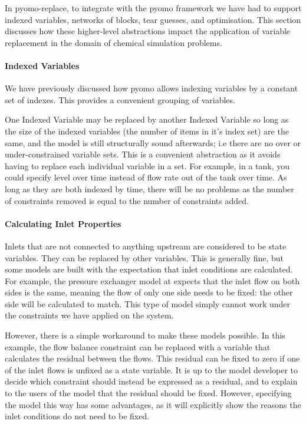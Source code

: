 In pyomo-replace, to integrate with the pyomo framework we have had to
support indexed variables, networks of blocks, tear guesses, and
optimisation. This section discusses how these higher-level abstractions
impact the application of variable replacement in the domain of chemical
simulation problems.

\hypertarget{indexed-variables}{%
\paragraph{Indexed Variables}\label{indexed-variables}}

We have previously discussed how pyomo allows indexing variables by a
constant set of indexes. This provides a convenient grouping of
variables.

One Indexed Variable may be replaced by another Indexed Variable so long
as the size of the indexed variables (the number of items in it's index
set) are the same, and the model is still structurally sound afterwards;
i.e there are no over or under-constrained variable sets. This is a
convenient abstraction as it avoids having to replace each individual
variable in a set. For example, in a tank, you could specify level over
time instead of flow rate out of the tank over time. As long as they are
both indexed by time, there will be no problems as the number of
constraints removed is equal to the number of constraints added.

\hypertarget{calculating-inlet-properties}{%
\paragraph{Calculating Inlet
Properties}\label{calculating-inlet-properties}}

Inlets that are not connected to anything upstream are considered to be
state variables. They can be replaced by other variables. This is
generally fine, but some models are built with the expectation that
inlet conditions are calculated. For example, the pressure exchanger
model at \citep{watertap_pressure_exchanger} expects that the inlet flow
on both sides is the same, meaning the flow of only one side needs to be
fixed: the other side will be calculated to match. This type of model
simply cannot work under the constraints we have applied on the system.

However, there is a simple workaround to make these models possible. In
this example, the flow balance constraint can be replaced with a
variable that calculates the residual between the flows. This residual
can be fixed to zero if one of the inlet flows is unfixed as a state
variable. It is up to the model developer to decide which constraint
should instead be expressed as a residual, and to explain to the users
of the model that the residual should be fixed. However, specifying the
model this way has some advantages, as it will explicitly show the
reasons the inlet conditions do not need to be fixed.


